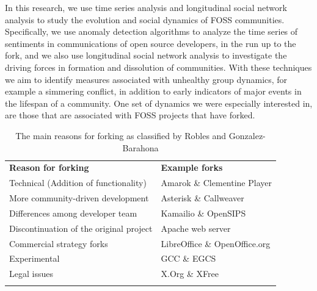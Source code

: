 \documentclass[12pt]{report}
\begin{document}
In this research, we use time series analysis and longitudinal social network analysis to study the evolution and social dynamics of FOSS communities. Specifically, we use anomaly detection algorithms to analyze the time series of sentiments in communications of open source developers, in the run up to the fork, and we also use longitudinal social network analysis to investigate the driving forces in formation and dissolution of communities. With these techniques we aim to identify measures associated with unhealthy group dynamics, for example a simmering conflict, in addition to early indicators of major events in the lifespan of a community. One set of dynamics we were especially interested in, are those that are associated with FOSS projects that have forked.

\begin{table}[!ht]
\centering
\caption[The main reasons for forking]{The main reasons for forking as classified by Robles and Gonzalez-Barahona \cite{Robles}}
\label{tableReasonsForForking}
\begin{tabular}{p{} p{}}
\hline\noalign{\smallskip}
\textbf{Reason for forking} & \textbf{Example forks} \\
\noalign{\smallskip}\hline\noalign{\smallskip}
Technical (Addition of functionality) & Amarok \& Clementine Player \\ \hline
More community-driven development & Asterisk \& Callweaver \\ \hline
Differences among developer team & Kamailio \& OpenSIPS \\ \hline
Discontinuation of the original project & Apache web server \\ \hline
Commercial strategy forks & LibreOffice \& OpenOffice.org \\ \hline
Experimental & GCC \& EGCS \\ \hline
Legal issues & X.Org \& XFree\\
\noalign{\smallskip}\hline
\end{tabular}
\end{table}
\end{document}
